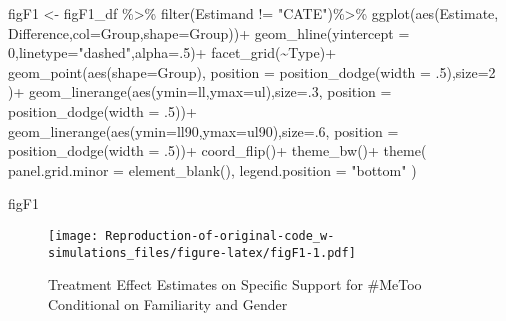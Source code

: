 \documentclass[
]{article}
\newenvironment{Shaded}{\begin{snugshade}}{\end{snugshade}}
\newcommand{\AttributeTok}[1]{\textcolor[rgb]{0.77,0.63,0.00}{#1}}
\newcommand{\DecValTok}[1]{\textcolor[rgb]{0.00,0.00,0.81}{#1}}
\newcommand{\FunctionTok}[1]{\textcolor[rgb]{0.00,0.00,0.00}{#1}}
\newcommand{\NormalTok}[1]{#1}
\newcommand{\OtherTok}[1]{\textcolor[rgb]{0.56,0.35,0.01}{#1}}
\newcommand{\SpecialCharTok}[1]{\textcolor[rgb]{0.00,0.00,0.00}{#1}}
\newcommand{\StringTok}[1]{\textcolor[rgb]{0.31,0.60,0.02}{#1}}
\begin{document}
\begin{Shaded}
\begin{Highlighting}[]
\NormalTok{figF1 }\OtherTok{\textless{}{-}}\NormalTok{ figF1\_df }\SpecialCharTok{\%\textgreater{}\%}
  \FunctionTok{filter}\NormalTok{(Estimand }\SpecialCharTok{!=} \StringTok{"CATE"}\NormalTok{)}\SpecialCharTok{\%\textgreater{}\%}
  \FunctionTok{ggplot}\NormalTok{(}\FunctionTok{aes}\NormalTok{(Estimate, Difference,}\AttributeTok{col=}\NormalTok{Group,}\AttributeTok{shape=}\NormalTok{Group))}\SpecialCharTok{+}
  \FunctionTok{geom\_hline}\NormalTok{(}\AttributeTok{yintercept =} \DecValTok{0}\NormalTok{,}\AttributeTok{linetype=}\StringTok{"dashed"}\NormalTok{,}\AttributeTok{alpha=}\NormalTok{.}\DecValTok{5}\NormalTok{)}\SpecialCharTok{+}
  \FunctionTok{facet\_grid}\NormalTok{(}\SpecialCharTok{\textasciitilde{}}\NormalTok{Type)}\SpecialCharTok{+}
  \FunctionTok{geom\_point}\NormalTok{(}\FunctionTok{aes}\NormalTok{(}\AttributeTok{shape=}\NormalTok{Group),}
                 \AttributeTok{position =} \FunctionTok{position\_dodge}\NormalTok{(}\AttributeTok{width =}\NormalTok{ .}\DecValTok{5}\NormalTok{),}\AttributeTok{size=}\DecValTok{2}
\NormalTok{      )}\SpecialCharTok{+}
  \FunctionTok{geom\_linerange}\NormalTok{(}\FunctionTok{aes}\NormalTok{(}\AttributeTok{ymin=}\NormalTok{ll,}\AttributeTok{ymax=}\NormalTok{ul),}\AttributeTok{size=}\NormalTok{.}\DecValTok{3}\NormalTok{,}
                       \AttributeTok{position =} \FunctionTok{position\_dodge}\NormalTok{(}\AttributeTok{width =}\NormalTok{ .}\DecValTok{5}\NormalTok{))}\SpecialCharTok{+}
  \FunctionTok{geom\_linerange}\NormalTok{(}\FunctionTok{aes}\NormalTok{(}\AttributeTok{ymin=}\NormalTok{ll90,}\AttributeTok{ymax=}\NormalTok{ul90),}\AttributeTok{size=}\NormalTok{.}\DecValTok{6}\NormalTok{,}
                     \AttributeTok{position =} \FunctionTok{position\_dodge}\NormalTok{(}\AttributeTok{width =}\NormalTok{ .}\DecValTok{5}\NormalTok{))}\SpecialCharTok{+}
  \FunctionTok{coord\_flip}\NormalTok{()}\SpecialCharTok{+}
  \FunctionTok{theme\_bw}\NormalTok{()}\SpecialCharTok{+}
  \FunctionTok{theme}\NormalTok{(}
    \AttributeTok{panel.grid.minor =} \FunctionTok{element\_blank}\NormalTok{(),}
    \AttributeTok{legend.position =} \StringTok{"bottom"}
\NormalTok{  )}

\NormalTok{figF1}
\end{Highlighting}
\end{Shaded}

\begin{figure}
\centering
\texttt{[image: Reproduction-of-original-code\_w-simulations\_files/figure-latex/figF1-1.pdf]}
\caption{Treatment Effect Estimates on Specific Support for \#MeToo
Conditional on Familiarity and Gender}
\end{figure}
\end{document}

